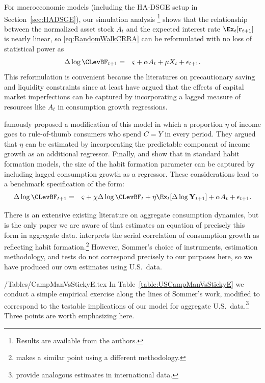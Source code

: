 \documentclass[titlepage]{\econtex}\newcommand{\texname}{cAndCwithStickyE}
\begin{document}
For macroeconomic models (including the HA-DSGE setup in Section~\ref{sec:HADSGE}), our simulation analysis
\footnote{Results are available from the authors.} 
shows that the relationship between the normalized asset stock $A_{t}$ and the expected interest rate $\Ex_{t}[\mathbf{r}_{t+1}]$ is nearly linear, so \eqref{eq:RandomWalkCRRA} can be reformulated with no loss of statistical power as
\begin{eqnarray*}
  \label{eq:RandomWalkAForm}
  \Delta \log \CLevBF_{t+1} & = & \varsigma+\alpha A_{t}+\mu X_{t}+\epsilon_{t+1}.
\end{eqnarray*}
This reformulation is convenient because the literatures on precautionary saving and liquidity constraints since at least \cite{zeldes:jpe,zeldesStochastic} have argued that the effects of capital market imperfections can be captured by incorporating a lagged measure of resources like $A_{t}$ in consumption growth regressions.

\cite{cmModel} famously proposed a modification of this model in which a proportion $\eta$ of income goes to rule-of-thumb consumers who spend $C=Y$ in every period.  They argued that $\eta$ can be estimated by incorporating the predictable component of income growth as an additional regressor.  Finally, \cite{dynanHabits} and \cite{som07} show that in standard habit formation models, the size of the habit formation parameter can be captured by including lagged consumption growth as a regressor.  These considerations lead to a benchmark specification of the form:
\begin{eqnarray}
  \label{eq:CGrowBench}
  \Delta \log \CLevBF_{t+1} & = & \varsigma+\chi \Delta \log \CLevBF_{t}+\eta \Ex_{t}[\Delta \log \mathbf{Y}_{t+1}]+\alpha A_{t}+\epsilon_{t+1}.
\end{eqnarray}

There is an extensive existing literature on aggregate consumption dynamics, but \cite{som07} is the only paper we are aware of that estimates an equation of precisely this form in aggregate data.  \cite{som07} interprets the serial correlation of consumption growth as reflecting habit formation.\footnote{\cite{weber:ruleofthumb} makes a similar point using a different methodology.}  However, Sommer's choice of instruments, estimation methodology, and tests do not correspond precisely to our purposes here, so we have produced our own estimates using U.S.\ data.

\econtexRoot/Tables/CampManVsStickyE.tex
In Table~\ref{table:USCampManVsStickyE} we conduct a simple empirical exercise along the lines of Sommer's work, modified to correspond to the testable implications of our model for aggregate U.S.\ data.\footnote{\cite{cssIntlStickyC} provide analogous estimates in international data.}  Three points are worth emphasizing here.
\end{document}
